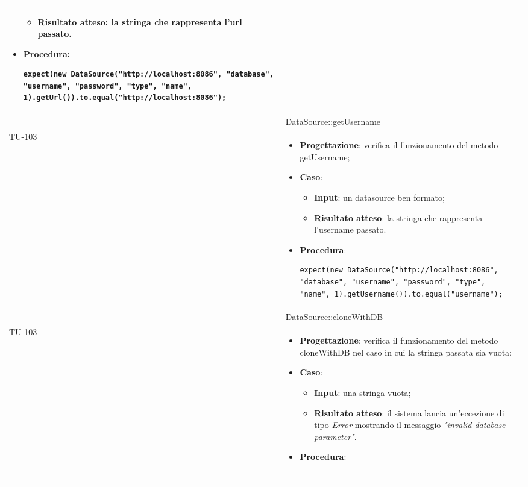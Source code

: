\begin{longtable}{|C{1.5cm}|C{14.5cm}|}
\begin{itemize}
\begin{itemize}
		\item \textbf{Risultato atteso}: la stringa che rappresenta l'url passato.
	\end{itemize}
	\item \textbf{Procedura}:
	\begin{lstlisting}
expect(new DataSource("http://localhost:8086", "database", "username", "password", "type", "name", 1).getUrl()).to.equal("http://localhost:8086");
	\end{lstlisting}
\end{itemize}\\
\hline
{} & DataSource::getUsername
\\ \hline
{TU-103} &
\begin{itemize}
	\item \textbf{Progettazione}: verifica il funzionamento del metodo getUsername;
	\item \textbf{Caso}: 
	\begin{itemize}
		\item \textbf{Input}: un datasource ben formato;
		\item \textbf{Risultato atteso}: la stringa che rappresenta l'username passato.
	\end{itemize}
	\item \textbf{Procedura}:
	\begin{lstlisting}
expect(new DataSource("http://localhost:8086", "database", "username", "password", "type", "name", 1).getUsername()).to.equal("username");
	\end{lstlisting}
\end{itemize}\\
\hline
{} & DataSource::cloneWithDB
\\ \hline
{TU-103} &
\begin{itemize}
	\item \textbf{Progettazione}: verifica il funzionamento del metodo cloneWithDB nel caso in cui la stringa passata sia vuota;
	\item \textbf{Caso}: 
	\begin{itemize}
		\item \textbf{Input}: una stringa vuota;
		\item \textbf{Risultato atteso}: il sistema lancia un'eccezione di tipo \emph{Error} mostrando il messaggio \emph{"invalid database parameter"}.
	\end{itemize}
	\item \textbf{Procedura}:
	\begin{lstlisting}

\end{lstlisting}
\end{itemize}
\end{longtable}
